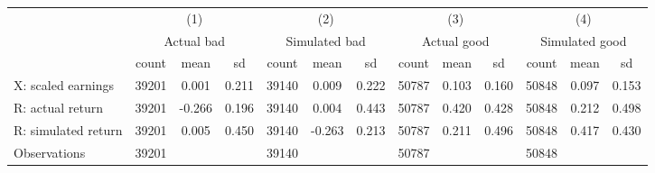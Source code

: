 {
\def\sym#1{\ifmmode^{#1}\else\(^{#1}\)\fi}
\begin{tabular}{l*{4}{ccc}}
\hline\hline
                    &\multicolumn{3}{c}{(1)}               &\multicolumn{3}{c}{(2)}               &\multicolumn{3}{c}{(3)}               &\multicolumn{3}{c}{(4)}               \\
                    &\multicolumn{3}{c}{Actual bad}        &\multicolumn{3}{c}{Simulated bad}     &\multicolumn{3}{c}{Actual good}       &\multicolumn{3}{c}{Simulated good}    \\
                    &       count&        mean&          sd&       count&        mean&          sd&       count&        mean&          sd&       count&        mean&          sd\\
\hline
X: scaled earnings  &       39201&       0.001&       0.211&       39140&       0.009&       0.222&       50787&       0.103&       0.160&       50848&       0.097&       0.153\\
R: actual return    &       39201&      -0.266&       0.196&       39140&       0.004&       0.443&       50787&       0.420&       0.428&       50848&       0.212&       0.498\\
R: simulated return &       39201&       0.005&       0.450&       39140&      -0.263&       0.213&       50787&       0.211&       0.496&       50848&       0.417&       0.430\\
\hline
Observations        &       39201&            &            &       39140&            &            &       50787&            &            &       50848&            &            \\
\hline\hline
\end{tabular}
}
